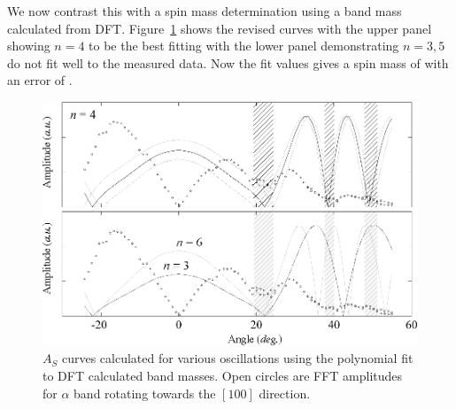 We now contrast this with a spin mass determination using a band mass calculated from \ac{DFT}. Figure~\ref{Fig:ResD:SpinMassFromDFTBand4} shows the revised curves with the upper panel showing $n=4$ to be the best fitting with the lower panel demonstrating $n = 3, 5$ do not fit well to the measured data. Now the fit values gives a spin mass of  with an error of .
\begin{figure}[htbp]
    \begin{center}
        \includegraphics[scale=0.7]{Chapter-dHvABaFe2P2/Figures/Mass/SpinMassBand4/SpinMassBand4}
        \caption{$A_S$ curves calculated for various oscillations using the polynomial fit to \ac{DFT} calculated band masses. Open circles are \ac{FFT} amplitudes for $\alpha$ band rotating towards the $[100]$ direction.}
        \label{Fig:ResD:SpinMassFromDFTBand4}
    \end{center}
\end{figure}
